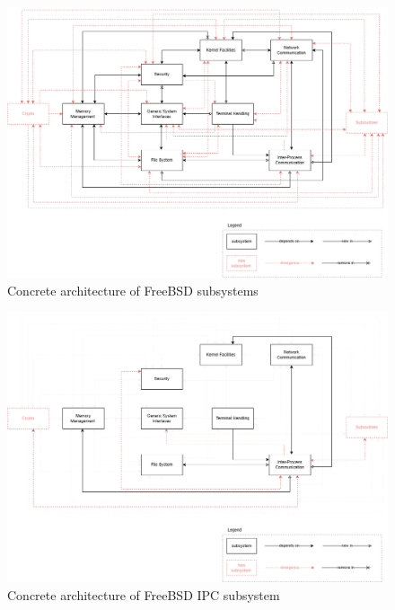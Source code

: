 \documentclass[12pt, dvipsnames, a4paper]{article}
\begin{document}
\begin{figure}[!htb]
	\center
	\includegraphics[width = 390pt]{assets/concrete-architecture.png}
	\caption{Concrete architecture of FreeBSD subsystems}
\end{figure}

\begin{figure}[!htb]
	\center
	\includegraphics[width = 390pt]{assets/ipc-concrete-architecture.png}
	\caption{Concrete architecture of FreeBSD IPC subsystem}
\end{figure}
\end{document}
